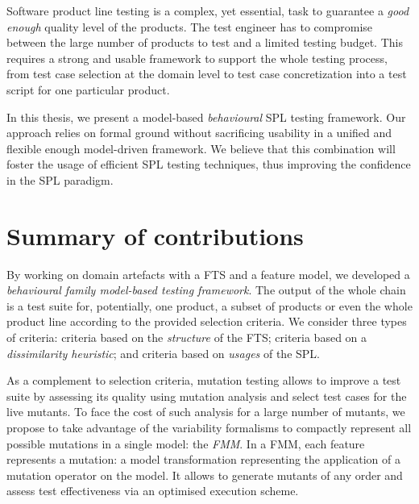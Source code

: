 
Software product line testing is a complex, yet essential, task to guarantee a \emph{good enough} quality level of the products. The test engineer has to compromise between the large number of products to test and a limited testing budget. This requires a strong and usable framework to support the whole testing process, from test case selection at the domain level to test case concretization into a test script for one particular product.

In this thesis, we present a model-based \emph{behavioural} \gls{SPL} testing framework. Our approach relies on formal ground without sacrificing usability in a unified and flexible enough model-driven framework. We believe that this combination will foster the usage of efficient SPL testing techniques, thus improving the confidence in the SPL paradigm.

\section{Summary of contributions}

By working on domain artefacts with a \gls{FTS} and a \gls{feature model}, we developed a\emph{ behavioural family model-based testing framework}. The output of the whole chain is a \gls{test suite} for, potentially, one product, a subset of products or even the whole product line according to the provided selection criteria. We consider three types of criteria: criteria based on the \emph{structure} of the FTS; criteria based on a \emph{dissimilarity heuristic}; and criteria based on \emph{usages} of the SPL. 
%

As a complement to selection criteria, mutation testing allows to improve a test suite by assessing its quality using mutation analysis and select test cases for the live mutants. To face the cost of such analysis for a large number of mutants, we propose to take advantage of the variability formalisms to compactly represent all possible mutations in a single model: the \emph{\acrfull{FMM}}. In a \gls{FMM}, each feature represents a mutation: \ie a model transformation representing the application of a mutation operator on the model. It allows to generate mutants of any order and assess test effectiveness via an optimised execution scheme.

